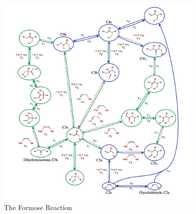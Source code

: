 \documentclass[]{article}
\begin{document}
\begin{figure}[H]
	\caption{The Formose Reaction}\label{fig:Formose}
	\includegraphics[width=0.9\textwidth]{Formose}
\end{figure}
\end{document}

